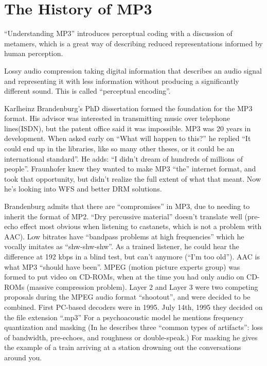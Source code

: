 \documentclass{thesis}
\begin{document}
\section{The History of MP3}
``Understanding MP3'' introduces perceptual coding with a discussion of metamers, which is a great way of describing reduced representations informed by human perception.

Lossy audio compression taking digital information that describes an audio signal and representing it with less information without producing a significantly different sound. This is called ``perceptual encoding''.\cite{Ruckert05}

Karlheinz Brandenburg's PhD dissertation formed the foundation for the MP3 format. His advisor was interested in transmitting music over telephone lines(ISDN), but the patent office said it was impossible. MP3 was 20 years in development. When asked early on ``What will happen to this?'' he replied ``It could end up in the libraries, like so many other theses, or it could be an international standard''. He adds: ``I didn't dream of hundreds of millions of people''. Fraunhofer knew they wanted to make MP3 ``the'' internet format, and took that opportunity, but didn't realize the full extent of what that meant. Now he's looking into WFS and better DRM solutions.\cite{brandenburg_interviews_2004}
	
Brandenburg admits that there are ``compromises'' in MP3, due to needing to inherit the format of MP2. ``Dry percussive material'' doesn't translate well (pre-echo effect most obvious when listening to castanets, which is not a problem with AAC). Low bitrates have ``bandpass problems at high frequencies'' which he vocally imitates as ``shw-shw-shw''. As a trained listener, he could hear the difference at 192 kbps in a blind test, but can't anymore (``I'm too old''). AAC is what MP3 ``should have been''. MPEG (motion picture experts group) was formed to put video on CD-ROMs, when at the time you had only audio on CD-ROMs (massive compression problem). Layer 2 and Layer 3 were two competing proposals during the MPEG audio format ``shootout'', and were decided to be combined. First PC-based decoders were in 1995. July 14th, 1995 they decided on the file extension ``.mp3'' For a psychoacoustic model he mentions frequency quantization and masking (In \cite{karlheinz_brandenburg_mp3_1999} he describes three ``common types of artifacts'': loss of bandwidth, pre-echoes, and roughness or double-speak.) For masking he gives the example of a train arriving at a station drowning out the conversations around you.
\end{document}
